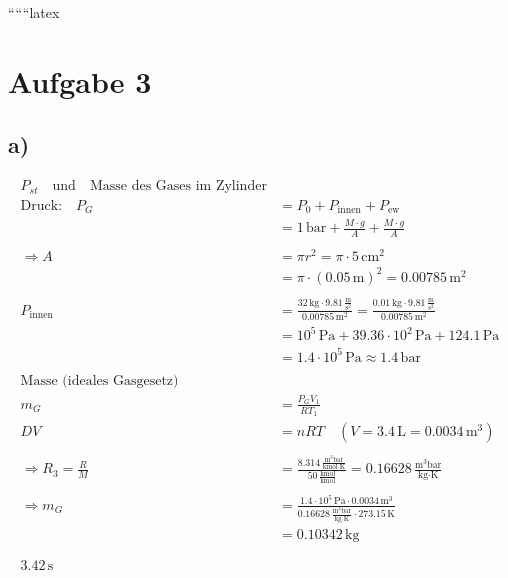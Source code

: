 
``````latex


\section*{Aufgabe 3}

\subsection*{a)}
\begin{align*}
    P_{st} \quad \text{und} \quad \text{Masse des Gases im Zylinder} \\
    \text{Druck:} \quad P_G &= P_0 + P_{\text{innen}} + P_{\text{ew}} \\
    &= 1 \, \text{bar} + \frac{M \cdot g}{A} + \frac{M \cdot g}{A} \\
    & \\
    \Rightarrow A &= \pi r^2 = \pi \cdot 5 \, \text{cm}^2 \\
    &= \pi \cdot (0.05 \, \text{m})^2 = 0.00785 \, \text{m}^2 \\
    & \\
    P_{\text{innen}} &= \frac{32 \, \text{kg} \cdot 9.81 \, \frac{\text{m}}{\text{s}^2}}{0.00785 \, \text{m}^2} = \frac{0.01 \, \text{kg} \cdot 9.81 \, \frac{\text{m}}{\text{s}^2}}{0.00785 \, \text{m}^2} \\
    &= 10^5 \, \text{Pa} + 39.36 \cdot 10^2 \, \text{Pa} + 124.1 \, \text{Pa} \\
    &= 1.4 \cdot 10^5 \, \text{Pa} \approx 1.4 \, \text{bar} \\
    & \\
    \text{Masse (ideales Gasgesetz)} \\
    m_G &= \frac{P_G V_1}{R T_1} \\
    D V &= n R T \quad (V = 3.4 \, \text{L} = 0.0034 \, \text{m}^3) \\
    & \\
    \Rightarrow R_3 = \frac{R}{M} &= \frac{8.314 \, \frac{\text{m}^3 \text{bar}}{\text{kmol} \cdot \text{K}}}{50 \, \frac{\text{kmol}}{\text{kmol}}} = 0.16628 \, \frac{\text{m}^3 \text{bar}}{\text{kg} \cdot \text{K}} \\
    & \\
    \Rightarrow m_G &= \frac{1.4 \cdot 10^5 \, \text{Pa} \cdot 0.0034 \, \text{m}^3}{0.16628 \, \frac{\text{m}^3 \text{bar}}{\text{kg} \cdot \text{K}} \cdot 273.15 \, \text{K}} \\
    &= 0.10342 \, \text{kg} \\
    & \\
    & \\
    3.42 \, \text{s} \\
\end{align*}

